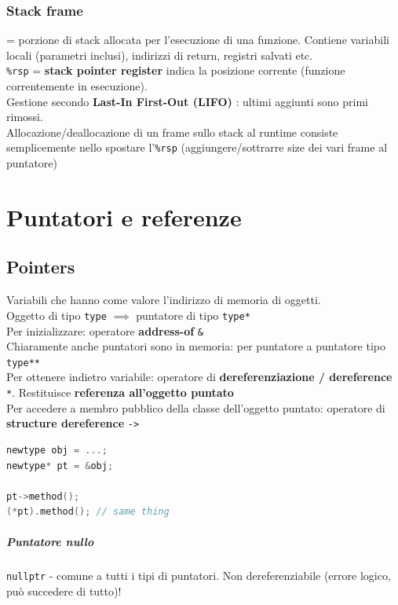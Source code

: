\documentclass[10pt, oneside]{book}
\begin{document}
\subsection{Stack frame}
= porzione di stack allocata per l'esecuzione di una funzione. Contiene variabili locali (parametri inclusi), indirizzi di return, registri salvati etc.\\
\texttt{\%rsp} = \textbf{stack pointer register} indica la posizione corrente (funzione correntemente in esecuzione).\\
Gestione secondo \textbf{Last-In First-Out (LIFO)} : ultimi aggiunti sono primi rimossi.\\
Allocazione/deallocazione di un frame sullo stack al runtime consiste semplicemente nello spostare l'\texttt{\%rsp} (aggiungere/sottrarre size dei vari frame al puntatore)



\chapter{Puntatori e referenze}

\section{Pointers}
Variabili che hanno come valore l'indirizzo di memoria di oggetti.\\
Oggetto di tipo \texttt{type} $\implies$ puntatore di tipo \texttt{type*}\\
Per inizializzare: operatore \textbf{address-of} \texttt{\&}\\
Chiaramente anche puntatori sono in memoria: per puntatore a puntatore tipo \texttt{type**}\\
Per ottenere indietro variabile: operatore di \textbf{dereferenziazione / dereference} \texttt{*}. Restituisce \textbf{referenza all'oggetto puntato}\\
Per accedere a membro pubblico della classe dell'oggetto puntato: operatore di \textbf{structure dereference} \texttt{->}
\begin{lstlisting}[language=C++]
newtype obj = ...;
newtype* pt = &obj;

pt->method();
(*pt).method(); // same thing
\end{lstlisting}

\paragraph{Puntatore nullo} \texttt{nullptr} - comune a tutti i tipi di puntatori. Non dereferenziabile (errore logico, può succedere di tutto)!
\end{document}
